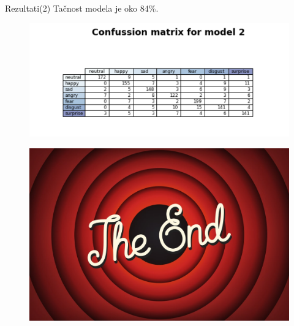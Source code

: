\documentclass{beamer}
\begin{document}
\begin{frame}{Rezultati(2)}
Tačnost modela je oko 84\%.
\begin{figure}[t]
\centering
\includegraphics[scale=0.5]{matrix2.png}
\end{figure}    
\end{frame}

\begin{frame}{}
\begin{figure}[h]
\includegraphics[scale=0.3]{end.jpg}
\end{figure}    

\end{frame}
\end{document}

